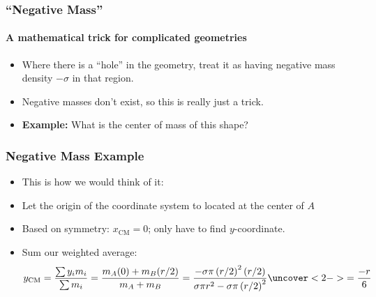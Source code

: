\documentclass[12pt,compress,aspectratio=169]{beamer}
\begin{document}
\begin{frame}
  \frametitle{``Negative Mass''}
  \framesubtitle{A mathematical trick for complicated geometries}
  \begin{itemize}
  \item Where there is a ``hole'' in the geometry, treat it as having negative
    mass density $-\sigma$ in that region.
  \item Negative masses don't exist, so this is really just a trick.
  \item\textbf{Example:} What is the center of mass of this shape?
    
    \begin{center}
    \end{center}
  \end{itemize}
\end{frame}


\begin{frame}
  \frametitle{Negative Mass Example}
  \begin{itemize}
  \item This is how we would think of it:
    
    \begin{center}
    \end{center}
  \item Let the origin of the coordinate system to located at the center of $A$
  \item Based on symmetry: $x_\mathrm{CM}=0$; only have to find $y$-coordinate.
  \item Sum our weighted average:
    {\large
      \begin{displaymath}
        y_\mathrm{CM}
        =\frac{\sum y_i m_i}{\sum m_i}
        =\frac{m_A(0) + m_B (r/2)}{m_A+m_B}
        =\frac{-\sigma\pi\left(r/2\right)^2(r/2)}{\sigma\pi r^2-\sigma\pi\left(r/2\right)^2}
        \uncover<2->{
          =\frac{-r}{6}
        }
      \end{displaymath}
    }
  \end{itemize}
\end{frame}
\end{document}
